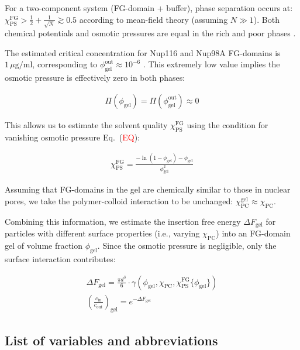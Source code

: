 \documentclass[10pt, a4paper]{article}
\newcommand\todo[1]{\textcolor{red}{#1}}
\begin{document}
\begin{multicols}{2}
For a two-component system (FG-domain + buffer), phase separation occurs at:
$
\chi_{\text{PS}}^{\text{FG}} > \frac{1}{2} + \frac{1}{\sqrt{N}} \gtrsim 0.5
$
according to mean-field theory (assuming $N \gg 1$). 
Both chemical potentials and osmotic pressures are equal in the rich and poor phases \cite{Vovk2016, Zilman2018}.

The estimated critical concentration for Nup116 and Nup98A FG-domains is $1 \, \mu\text{g}/\text{ml}$, corresponding to $\phi_{\text{gel}}^{\text{out}} \approx 10^{-6}$ \cite{Schmidt2015}.
This extremely low value implies the osmotic pressure is effectively zero in both phases:

\begin{eqnarray}
    \Pi(\phi_{\text{gel}}) = \Pi(\phi_{\text{gel}}^{\text{out}}) \approx 0
\end{eqnarray}

This allows us to estimate the solvent quality $\chi_{\text{PS}}^{\text{FG}}$ using the condition for vanishing osmotic pressure Eq.~(\todo{EQ}):

\begin{eqnarray}
    \chi_{\text{PS}}^{\text{FG}} = \frac{-\ln(1-\phi_{\text{gel}}) - \phi_{\text{gel}}}{\phi_{\text{gel}}^2}
\end{eqnarray}

Assuming that FG-domains in the gel are chemically similar to those in nuclear pores, we take the polymer-colloid interaction to be unchanged: $\chi_{\text{PC}}^{\text{gel}} \approx \chi_{\text{PC}}$.

Combining this information, we estimate the insertion free energy $\Delta F_{\text{gel}}$ for particles with different surface properties (i.e., varying $\chi_{\text{PC}}$) into an FG-domain gel of volume fraction $\phi_{\text{gel}}$.
Since the osmotic pressure is negligible, only the surface interaction contributes:

\begin{eqnarray}
    \Delta F_{\text{gel}} =
    \frac{\pi d^3}{6} \cdot \gamma\left(
    \phi_{\text{gel}}, \chi_{\text{PC}},
    \chi_{\text{PS}}^{\text{FG}}\{ \phi_{\text{gel}} \}
    \right) \\
    \left(\frac{c_{\text{in}}}{c_{\text{out}}}\right)_{\text{gel}} = e^{-\Delta F_{\text{gel}}}
\end{eqnarray}

\end{multicols}



\pagebreak
\subsection*{List of variables and abbreviations}
\end{document}
